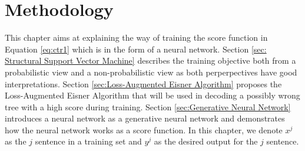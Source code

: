 
\chapter{Methodology}
\label{cha:method}
This chapter aims at explaining the way of training the score function in Equation \ref{eq:ctr1} which is in the form of a neural network. Section \ref{sec: Structural Support Vector Machine} describes the training objective both from a probabilistic view and a non-probabilistic view as both perperpectives have good interpretations. Section \ref{sec:Loss-Augmented Eisner Algorithm} proposes the Loss-Augmented Eisner Algorithm that will be used in decoding a possibly wrong tree with a high score during training. Section \ref{sec:Generative Neural Network} introduces a neural network as a generative neural network and demonstrates how the neural network works as a score function. In this chapter, we denote $x^j$ as the $j$ sentence in a training set and $y^j$ as the desired output for the $j$ sentence.


